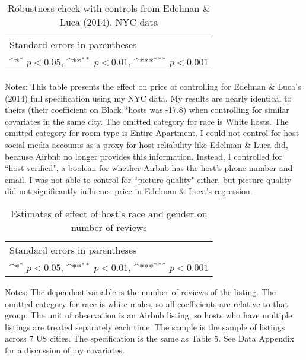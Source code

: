 \documentclass[11pt, oneside]{article}
\begin{document}
\begin{table}[htbp]\centering
	\def\sym#1{\ifmmode^{#1}\else\(^{#1}\)\fi}

	\caption{Robustness check with controls from Edelman \& Luca (2014), NYC data}
	\begin{tabular}{l*{1}{c}}
		\hline\hline
		 
		\hline\hline
		\multicolumn{2}{l}{\footnotesize Standard errors in parentheses}\\
		\multicolumn{2}{l}{\footnotesize \sym{*} \(p<0.05\), \sym{**} \(p<0.01\), \sym{***} \(p<0.001\)}\\
	\end{tabular}
	\begin{tablenotes}
				
		\item Notes: This table presents the effect on price of controlling for Edelman \& Luca's (2014) full specification using my NYC data. My results are nearly identical to theirs (their coefficient on Black *hosts was -17.8) when controlling for similar covariates in the same city. The omitted category for race is White hosts. The omitted category for room type is Entire Apartment. I could not control for host social media accounts as a proxy for host reliability like Edelman \& Luca did, because Airbnb no longer provides this information. Instead, I controlled for ``host verified", a boolean for whether Airbnb has the host's phone number and email. I was not able to control for ``picture quality" either, but picture quality did not significantly influence price in Edelman \& Luca's regression.
	\end{tablenotes}
	
\end{table}

\begin{table}[htbp]\centering
	\def\sym#1{\ifmmode^{#1}\else\(^{#1}\)\fi}
	\caption{Estimates of effect of host’s race and gender on number of reviews}
	\begin{tabular}{l*{4}{c}}
		\hline\hline
		
		\hline\hline
		\multicolumn{5}{l}{\footnotesize Standard errors in parentheses}\\
		\multicolumn{5}{l}{\footnotesize \sym{*} \(p<0.05\), \sym{**} \(p<0.01\), \sym{***} \(p<0.001\)}\\
	\end{tabular}
	\begin{tablenotes}

		\item Notes: The dependent variable is the number of reviews of the listing. The omitted category for race is white males, so all coefficients are relative to that group. The unit of observation is an Airbnb listing, so hosts who have multiple listings are treated separately each time. The sample is the sample of listings across 7 US cities. The specification is the same as Table 5. See Data Appendix for a discussion of my covariates.	
	\end{tablenotes}
\end{table}
\end{document}
